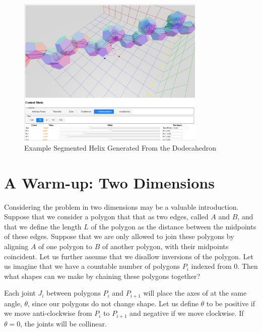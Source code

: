 \documentclass[11pt]{article}
\begin{document}
{\begin{figure}
     \centering
     \includegraphics[width=0.80\textwidth]{figures/Dodecahedral.png}
     \caption{Example Segmented Helix Generated From the Dodecahedron}
  \label{fig:dodecahedron}
\end{figure}


\section{A Warm-up: Two Dimensions}

Considering the problem in two dimensions may be a valuable introduction.
Suppose that we consider a polygon that that as two edges, called $A$ and $B$, and that we define the length $L$ of the
polygon as the distance between the midpoints of these edges. Suppose that we are only allowed to join these
polygons by aligning $A$ of one polygon to $B$ of another polygon, with their midpoints coincident. Let us
further assume that we disallow inversions of the polygon.  Let us imagine that we have a
countable number of polygons $P_i$ indexed from $0$. Then what shapes can we make by chaining these
polygons together?

Each joint $J_i$ between polygons $P_i$ and $P_{i+1}$ will place the axes of at the same angle, $\theta$, since
our polygons do not change shape. Let us define $\theta$ to be positive
if we move anti-clockwise from $P_i$ to $P_{i+1}$ and negative if we move clockwise.
If $\theta = 0$, the joints will be collinear.

}
\end{document}
